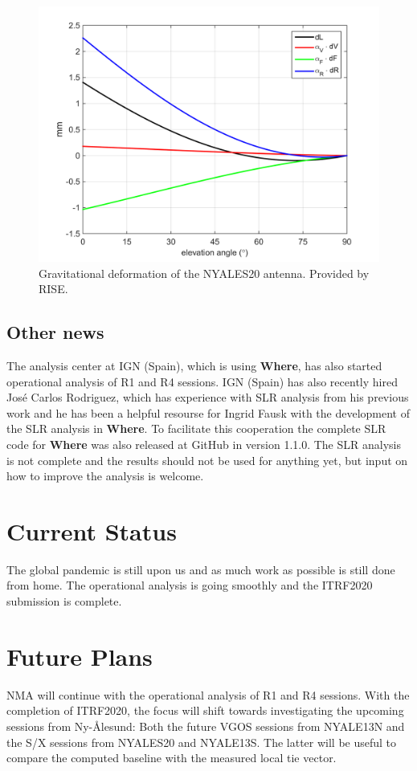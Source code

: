 \documentclass[twocolumn,twoside]{svmultivs_br} %
\begin{document}
\begin{figure}[htb!]
\begin{center}
\includegraphics[width=16.0cm]{acnma01.png}
\end{center}
\caption{Gravitational deformation of the NYALES20 antenna. Provided by RISE.}
\label{fig:grav_deform}
\end{figure}

\subsection{Other news}
The analysis center at IGN (Spain), which is using \textbf{Where}, has also started operational analysis of R1 
and R4 sessions. IGN (Spain) has also recently hired José Carlos Rodriguez, which has experience with SLR analysis from his
previous work and he has been a helpful resourse for Ingrid Fausk with the development of the SLR analysis in 
\textbf{Where}. To facilitate this cooperation the complete SLR code for \textbf{Where} was also released at GitHub
in version 1.1.0. The SLR analysis is not complete and the results should not be used for anything yet, but input
on how to improve the analysis is welcome.    
%
\section{Current Status}
%
The global pandemic is still upon us and as much work as possible is still done from home. The operational analysis is
going smoothly and the ITRF2020 submission is complete.  
%
\section{Future Plans}
%
NMA will continue with the operational analysis of R1 and R4 sessions. With the completion of ITRF2020, the focus
will shift towards investigating the upcoming sessions from Ny-\AA lesund: Both the future VGOS sessions from
NYALE13N and the S/X sessions from NYALES20 and NYALE13S. The latter will be useful to compare the computed baseline
with the measured local tie vector. 
\end{document}
